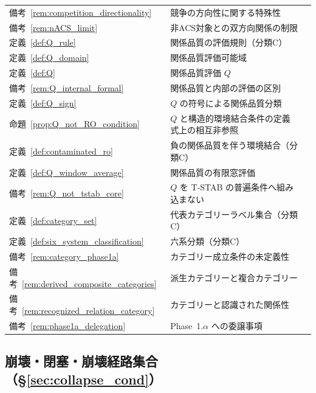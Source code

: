 \begin{longtable}{p{2.4cm} p{10.4cm} r}
備考~\ref{rem:competition_directionality} & 競争の方向性に関する特殊性 & \pageref{rem:competition_directionality} \\
備考~\ref{rem:nACS_limit} & 非ACS対象との双方向関係の制限 & \pageref{rem:nACS_limit} \\
定義~\ref{def:Q_rule} & 関係品質の評価規則（分類C） & \pageref{def:Q_rule} \\
定義~\ref{def:Q_domain} & 関係品質評価可能域 & \pageref{def:Q_domain} \\
定義~\ref{def:Q} & 関係品質評価 $Q$ & \pageref{def:Q} \\
備考~\ref{rem:Q_internal_formal} & 関係品質と内部の評価の区別 & \pageref{rem:Q_internal_formal} \\
定義~\ref{def:Q_sign} & $Q$ の符号による関係品質分類 & \pageref{def:Q_sign} \\
命題~\ref{prop:Q_not_RO_condition} & $Q$ と構造的環境結合条件の定義式上の相互非参照 & \pageref{prop:Q_not_RO_condition} \\
定義~\ref{def:contaminated_ro} & 負の関係品質を伴う環境結合（分類C） & \pageref{def:contaminated_ro} \\
定義~\ref{def:Q_window_average} & 関係品質の有限窓評価 & \pageref{def:Q_window_average} \\
備考~\ref{rem:Q_not_tstab_core} & $Q$ を T-STAB の普遍条件へ組み込まない & \pageref{rem:Q_not_tstab_core} \\
定義~\ref{def:category_set} & 代表カテゴリーラベル集合（分類C） & \pageref{def:category_set} \\
定義~\ref{def:six_system_classification} & 六系分類（分類C） & \pageref{def:six_system_classification} \\
備考~\ref{rem:category_phase1a} & カテゴリー成立条件の未定義性 & \pageref{rem:category_phase1a} \\
備考~\ref{rem:derived_composite_categories} & 派生カテゴリーと複合カテゴリー & \pageref{rem:derived_composite_categories} \\
備考~\ref{rem:recognized_relation_category} & カテゴリーと認識された関係性 & \pageref{rem:recognized_relation_category} \\
備考~\ref{rem:phase1a_delegation} & Phase~1.$\alpha$ への委譲事項 & \pageref{rem:phase1a_delegation} \\
\end{longtable}
\endgroup

\subsection*{崩壊・閉塞・崩壊経路集合（\S\ref{sec:collapse_cond}）}

